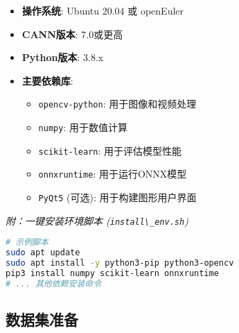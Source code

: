 \begin{itemize}
\tightlist
\item
  \textbf{操作系统}: Ubuntu 20.04 或 openEuler
\item
  \textbf{CANN版本}: 7.0或更高
\item
  \textbf{Python版本}: 3.8.x
\item
  \textbf{主要依赖库}:

  \begin{itemize}
  \tightlist
  \item
    \passthrough{\lstinline!opencv-python!}: 用于图像和视频处理
  \item
    \passthrough{\lstinline!numpy!}: 用于数值计算
  \item
    \passthrough{\lstinline!scikit-learn!}: 用于评估模型性能
  \item
    \passthrough{\lstinline!onnxruntime!}: 用于运行ONNX模型
  \item
    \passthrough{\lstinline!PyQt5!} (可选): 用于构建图形用户界面
  \end{itemize}
\end{itemize}

\emph{附：一键安装环境脚本 (\passthrough{\lstinline!install\_env.sh!})}

\begin{lstlisting}[language=bash]
# 示例脚本
sudo apt update
sudo apt install -y python3-pip python3-opencv
pip3 install numpy scikit-learn onnxruntime
# ... 其他依赖安装命令
\end{lstlisting}

\subsection{数据集准备}\label{ux6570ux636eux96c6ux51c6ux5907}

